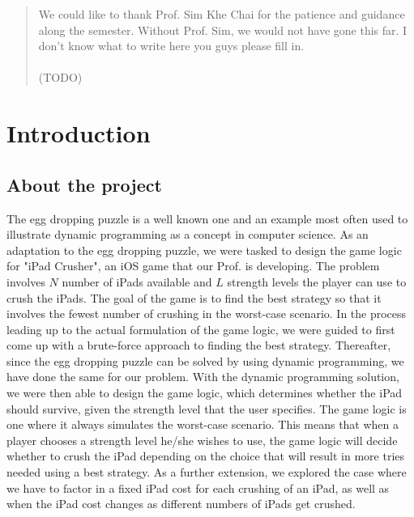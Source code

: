 \documentclass[12pt,a4paper,oneside]{report}
\begin{document}
\renewcommand{\abstractname}{Acknowledgements}
\begin{abstract}
\setcounter{page}{3}
\thispagestyle{plain}
\onehalfspacing
{}
We could like to thank Prof. Sim Khe Chai for the patience and guidance along the semester. Without Prof. Sim, we would not have gone this far. I don't know what to write here you guys please fill in. \\\\
(TODO)
\end{abstract}

\onehalfspacing
\tableofcontents
\thispagestyle{empty}

\chapter{Introduction}
\setcounter{page}{1}
\section{About the project}
The egg dropping puzzle is a well known one and an example most often used to illustrate dynamic programming as a concept in computer science. As an adaptation to the egg dropping puzzle, we were tasked to design the game logic for "iPad Crusher", an iOS game that our Prof. is developing. The problem involves $N$ number of iPads available and $L$ strength levels the player can use to crush the iPads. The goal of the game is to find the best strategy so that it involves the fewest number of crushing in the worst-case scenario. In the process leading up to the actual formulation of the game logic, we were guided to first come up with a brute-force approach to finding the best strategy. Thereafter, since the egg dropping puzzle can be solved by using dynamic programming, we have done the same for our problem. With the dynamic programming solution, we were then able to design the game logic, which determines whether the iPad should survive, given the strength level that the user specifies. The game logic is one where it always simulates the worst-case scenario. This means that when a player chooses a strength level he/she wishes to use, the game logic will decide whether to crush the iPad depending on the choice that will result in more tries needed using a best strategy. As a further extension, we explored the case where we have to factor in a fixed iPad cost for each crushing of an iPad, as well as when the iPad cost changes as different numbers of iPads get crushed.
\end{document}
